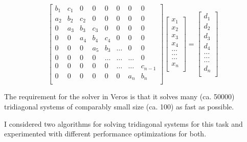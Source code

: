 \documentclass[a4paper,oneside]{memoir}
\begin{document}
\begin{equation} \label{eq:tridiag}
    \begin{bmatrix}
        b_1 & c_1 & 0  & 0 & 0 & 0 & 0 & 0 \\
        a_2 & b_2 & c_2 & 0 & 0 & 0 & 0 & 0\\
        0   & a_3 & b_3 & c_3 & 0 & 0 & 0 & 0\\
        0   &  0  & a_4 & b_4 & c_4 & 0 & 0 & 0\\
        0   &  0  &  0  & a_5 & b_3 & \dots & 0  & 0\\
        0   &  0  &  0  &  0  & \dots & \dots &  \dots & 0 \\
        0   &  0  &  0  &  0  &  0  & \dots & \dots & c_{n-1}\\
        0   &  0  &  0  &  0  &  0  &  0  & a_n & b_n \\
    \end{bmatrix}
    \begin{bmatrix}
        x_1 \\
        x_2 \\
        x_3   \\
        x_4   \\
        \dots   \\
        \dots   \\
        \dots   \\
        x_n   \\
    \end{bmatrix}
     = 
     \begin{bmatrix}
        d_1 \\
        d_2 \\
        d_3   \\
        d_4   \\
        \dots   \\
        \dots   \\
        \dots   \\
        d_n   \\
    \end{bmatrix}
\end{equation}


The requirement for the solver in Veros is that it solves many (ca. 50000) tridiagonal systems of comparably small size (ca. 100) as fast as possible.

I considered two algorithms for solving tridiagonal systems for this task and experimented with different performance optimizations for both.
\end{document}
